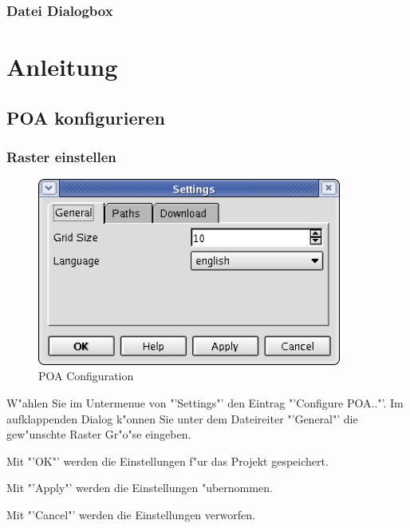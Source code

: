 \documentclass[a4paper,titlepage,12pt,ngerman]{scrbook}
\begin{document}
\subsection{Datei Dialogbox}


\chapter{Anleitung}


\section{POA konfigurieren}

\subsection{Raster einstellen}
\begin{figure}[htbp]
\begin{center}
\includegraphics[width=10cm]{POAConfiguration1}
\caption{POA Configuration}\label{test}
\end{center}
\end{figure}
W"ahlen Sie im Untermenue von "'Settings"' den Eintrag "'Configure POA.."'. Im aufklappenden Dialog k"onnen Sie unter dem Dateireiter "'General"' die gew"unschte Raster Gr"o"se eingeben.\par
Mit "'OK"' werden die Einstellungen f"ur das Projekt gespeichert.\par
Mit "'Apply"' werden die Einstellungen "ubernommen.\par
Mit "'Cancel"' werden die Einstellungen verworfen.\par 
\end{document}
